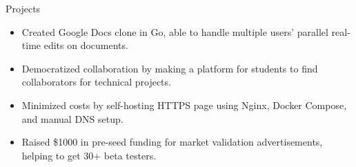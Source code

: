 \documentclass{resume} %
\begin{document}
\begin{workSection}{Projects}
	
	\customItem[
	title=Ashdocs,
	technologies= | Go(Golang){,} Websockets,
	]
	\begin{itemize}
		\vspace{-0.5em}
		\itemsep -6pt {}
		\item Created Google Docs clone in {Go}, able to handle multiple users' parallel real-time edits on documents.
	\end{itemize}
	
	\customItem[
	title=\href{https://github.com/AshkanArabim/hackerhunt}{hackerhunt.tech },
	technologies= | Django{,} React{,} TypeScript{,} Nginx{,} Docker{,} AWS SES,
	duration=%
	]
	\begin{itemize}
		\vspace{-0.5em}
		\itemsep -6pt {}
		\item Democratized collaboration by making a platform for students to find collaborators for technical projects. 
		\item Minimized costs by self-hosting HTTPS page using {Nginx}, {Docker Compose}, and manual DNS setup.
		\item Raised {\$1000 in pre-seed funding} for market validation advertisements, helping to get {30+ beta testers}. %
	\end{itemize}
	

\end{workSection}
\end{document}
